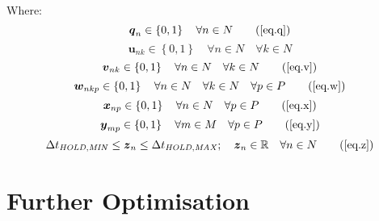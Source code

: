 Where:
\begin{equation}
    \boldsymbol{q}_{n} \in \left\{ 0, 1 \right\} \quad \forall n \in N
    \tag{\ref{eq.q}}
\end{equation}
\begin{equation}
    \boldsymbol{u}_{nk} \in \left\{ 0, 1 \right\} \quad \forall n \in N \quad
    \forall k \in N
    \label{eq.u}
\end{equation}
\begin{equation}
    \boldsymbol{v}_{nk} \in \left\{ 0, 1 \right\} \quad \forall n \in N \quad
    \forall k \in N
    \tag{\ref{eq.v}}
\end{equation}
\begin{equation}
    \boldsymbol{w}_{nkp} \in \left\{ 0, 1 \right\} \quad \forall n \in N \quad
    \forall k \in N \quad \forall p \in P
    \tag{\ref{eq.w}}
\end{equation}
\begin{equation}
    \boldsymbol{x}_{np} \in \left\{ 0, 1 \right\} \quad \forall n \in N \quad
    \forall p \in P
    \tag{\ref{eq.x}}
\end{equation}
\begin{equation}
    \boldsymbol{y}_{mp} \in \left\{ 0, 1 \right\} \quad \forall m \in M \quad
    \forall p \in P
    \tag{\ref{eq.y}}
\end{equation}
\begin{equation}
    \Delta t_{\mathit{HOLD,MIN}} \le \boldsymbol{z}_{n} \le \Delta
    t_{\mathit{HOLD,MAX}}; \quad \boldsymbol{z}_{n} \in \mathbb{R} \quad
    \forall n \in N
    \tag{\ref{eq.z}}
\end{equation}

\section{Further Optimisation}\label{S.implementation}

